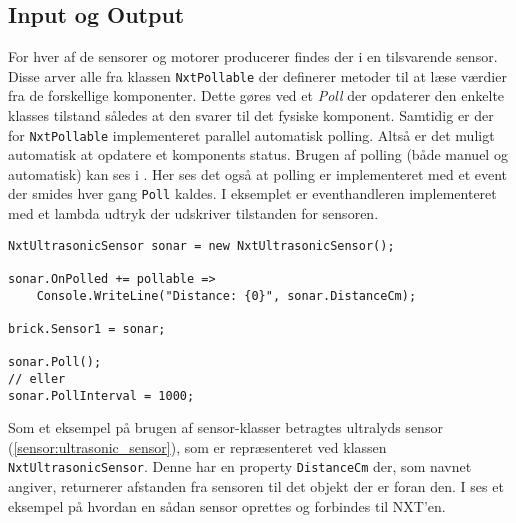 \subsection{Input og Output}
For hver af de sensorer og motorer \lego producerer findes der i \mindsqualls en tilsvarende sensor.
Disse arver alle fra klassen \lstinline[style=csharp]!NxtPollable! der definerer metoder til at læse værdier fra de forskellige komponenter.
Dette gøres ved et \emph{Poll} der opdaterer den enkelte klasses tilstand således at den svarer til det fysiske komponent.
Samtidig er der for \lstinline[style=csharp]!NxtPollable! implementeret parallel automatisk polling.
Altså er det muligt automatisk at opdatere et komponents status.
Brugen af polling (både manuel og automatisk) kan ses i .
Her ses det også at polling er implementeret med et event der smides hver gang \lstinline[style=csharp]!Poll! kaldes.
I eksemplet er eventhandleren implementeret med et lambda udtryk der udskriver tilstanden for sensoren.

\begin{lstlisting}[style=csharpsmall,caption={Et eksempel på polling i \mindsqualls},label=mindsqualls:polling]
NxtUltrasonicSensor sonar = new NxtUltrasonicSensor();

sonar.OnPolled += pollable =>
    Console.WriteLine("Distance: {0}", sonar.DistanceCm);

brick.Sensor1 = sonar;

sonar.Poll();
// eller
sonar.PollInterval = 1000;
\end{lstlisting}

Som et eksempel på brugen af sensor-klasser betragtes \legos ultralyds sensor (\cref{sensor:ultrasonic_sensor}), som er repræsenteret ved klassen \lstinline[style=csharp]!NxtUltrasonicSensor!.
Denne har en property \lstinline[style=csharp]!DistanceCm! der, som navnet angiver, returnerer afstanden fra sensoren til det objekt der er foran den.
I  ses et eksempel på hvordan en sådan sensor oprettes og forbindes til NXT'en.
